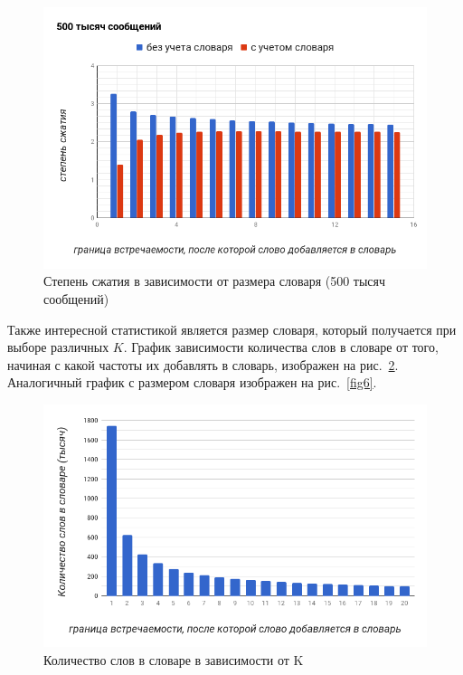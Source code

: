 \begin{figure}[h!]
  \includegraphics[width=5in]{pics/compress500k.png}
  \caption{Степень сжатия в зависимости от размера словаря (500 тысяч сообщений)}
  \label{fig4}
\end{figure}

Также интересной статистикой является размер словаря, который получается при выборе различных $K$. 
График зависимости количества слов в словаре от того, начиная с какой частоты их добавлять в словарь,
 изображен на рис.~\ref{fig5}. Аналогичный график с размером словаря изображен на рис.~\ref{fig6}. 

\begin{figure}[h!]
  \includegraphics[width=5in]{pics/words_in_dict.png}
  \caption{Количество слов в словаре в зависимости от K}
  \label{fig5}
\end{figure}

